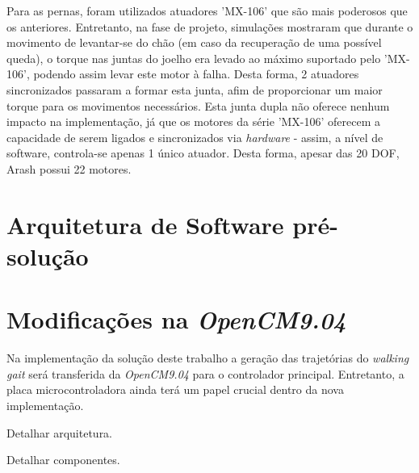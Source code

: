 Para as pernas, foram utilizados atuadores 'MX-106' que são mais poderosos que os anteriores. Entretanto, na fase de projeto, simulações mostraram que durante o movimento de levantar-se do chão (em caso da recuperação de uma possível queda), o torque nas juntas do joelho era levado ao máximo suportado pelo 'MX-106', podendo assim levar este motor à falha. Desta forma, 2 atuadores sincronizados passaram a formar esta junta, afim de proporcionar um maior torque para os movimentos necessários. Esta junta dupla não oferece nenhum impacto na implementação, já que os motores da série 'MX-106' oferecem a capacidade de serem ligados e sincronizados via \textit{hardware} - assim, a nível de software, controla-se apenas 1 único atuador. Desta forma, apesar das 20 DOF, Arash possui 22 motores.

\section{Arquitetura de Software pré-solução}



\section{Modificações na \textit{OpenCM9.04}}

Na implementação da solução deste trabalho a geração das trajetórias do \textit{walking gait} será transferida da \textit{OpenCM9.04} para o controlador principal. Entretanto, a placa microcontroladora ainda terá um papel crucial dentro da nova implementação.


\begin{guide}
Detalhar arquitetura.
\end{guide}

\begin{guide}
Detalhar componentes.
\end{guide}


